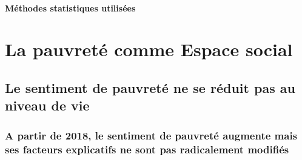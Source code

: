 \documentclass[12pt,a4paper]{reedthesis}
\begin{document}
\hypertarget{sec:methodes}{%
\subsubsection{Méthodes statistiques utilisées}\label{sec:methodes}}

\hypertarget{la-pauvretuxe9-comme-espace-social}{%
\chapter{La pauvreté comme Espace social}\label{la-pauvretuxe9-comme-espace-social}}

\hypertarget{sec:nonreducnv}{%
\section{Le sentiment de pauvreté ne se réduit pas au niveau de vie}\label{sec:nonreducnv}}

\hypertarget{a-partir-de-2018-le-sentiment-de-pauvretuxe9-augmente-mais-ses-facteurs-explicatifs-ne-sont-pas-radicalement-modifiuxe9s}{%
\subsection{A partir de 2018, le sentiment de pauvreté augmente mais ses facteurs explicatifs ne sont pas radicalement modifiés}\label{a-partir-de-2018-le-sentiment-de-pauvretuxe9-augmente-mais-ses-facteurs-explicatifs-ne-sont-pas-radicalement-modifiuxe9s}}
\end{document}

